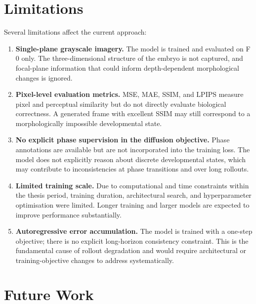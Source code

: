 \documentclass[12pt, a4paper, twoside]{report}
\begin{document}
\section{Limitations}
\label{sec:limitations}

Several limitations affect the current approach:

\begin{enumerate}
  \item \textbf{Single-plane grayscale imagery.} The model is trained and
        evaluated on F$0$ only.
        The three-dimensional structure of the embryo is not captured, and
        focal-plane information that could inform depth-dependent morphological
        changes is ignored.

  \item \textbf{Pixel-level evaluation metrics.} MSE, MAE, SSIM, and LPIPS
        measure pixel and perceptual similarity but do not directly evaluate
        biological correctness.
        A generated frame with excellent SSIM may still correspond to a
        morphologically impossible developmental state.

  \item \textbf{No explicit phase supervision in the diffusion objective.}
        Phase annotations are available but are not incorporated into the
        training loss.
        The model does not explicitly reason about discrete developmental
        states, which may contribute to inconsistencies at phase transitions
        and over long rollouts.

  \item \textbf{Limited training scale.} Due to computational and time
        constraints within the thesis period, training duration, architectural
        search, and hyperparameter optimisation were limited.
        Longer training and larger models are expected to improve performance
        substantially.

  \item \textbf{Autoregressive error accumulation.} The model is trained
        with a one-step objective; there is no explicit long-horizon
        consistency constraint.
        This is the fundamental cause of rollout degradation and would require
        architectural or training-objective changes to address systematically.
\end{enumerate}

\section{Future Work}
\label{sec:future_work}
\end{document}
